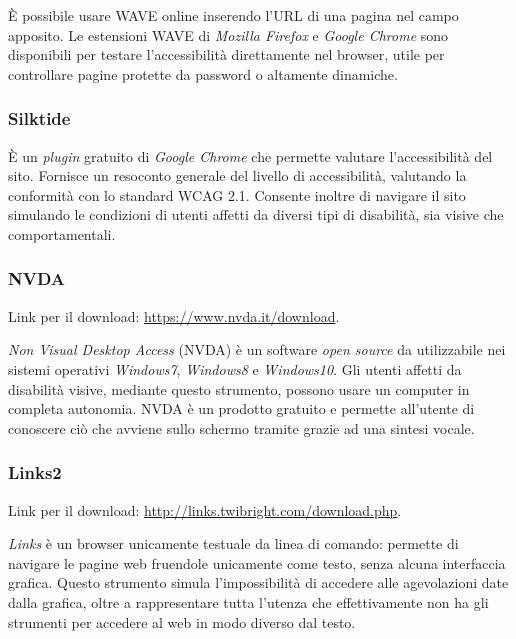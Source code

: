 È possibile usare WAVE online inserendo l'URL di una pagina nel campo apposito. Le estensioni WAVE di \textit{Mozilla Firefox} e \textit{Google Chrome} sono disponibili per testare l'accessibilità direttamente nel browser, utile per controllare pagine protette da password o altamente dinamiche. 


\subsubsection{Silktide}
\label{test-strumenti-silktide}
È un \textit{plugin} gratuito di \textit{Google Chrome} che permette valutare l'accessibilità del sito. Fornisce un resoconto generale del livello di accessibilità, valutando la conformità con lo standard WCAG 2.1. Consente inoltre di navigare il sito simulando le condizioni di utenti affetti da diversi tipi di disabilità, sia visive che comportamentali. 


\subsubsection{NVDA}
\label{test-strumenti-nvda}
Link per il download: \url{https://www.nvda.it/download}.

\textit{Non Visual Desktop Access} (NVDA) è un software \textit{open source} da utilizzabile nei sistemi operativi \textit{Windows7}, \textit{Windows8} e \textit{Windows10}.
Gli utenti affetti da disabilità visive, mediante questo strumento, possono usare un computer in completa autonomia. NVDA è un prodotto gratuito e permette all'utente di conoscere ciò che avviene sullo schermo tramite grazie ad una sintesi vocale.

\subsubsection{Links2}
\label{test-strumenti-links2}
Link per il download: \url{http://links.twibright.com/download.php}.

\textit{Links} è un browser unicamente testuale da linea di comando: permette di navigare le pagine web fruendole unicamente come testo, senza alcuna interfaccia grafica. Questo strumento simula l'impossibilità di accedere alle agevolazioni date dalla grafica, oltre a rappresentare tutta l'utenza che effettivamente non ha gli strumenti per accedere al web in modo diverso dal testo.

